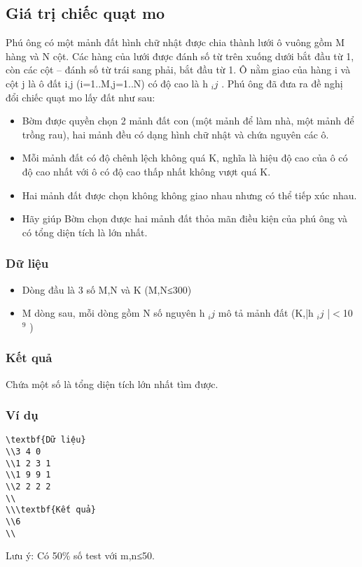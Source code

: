 







\subsection{   Giá trị chiếc quạt mo  }

   Phú ông có một mảnh đất hình chữ nhật được chia thành lưới ô vuông gồm M hàng và N cột. Các hàng của lưới được đánh số từ trên xuống dưới bắt đầu từ 1, còn các cột – đánh số từ trái sang phải, bắt đầu từ 1. Ô nằm giao của hàng i và cột j là ô đất i,j (i=1..M,j=1..N) có độ cao là h   $_    ij   $   . Phú ông đã đưa ra đề nghị đổi chiếc quạt mo lấy đất như sau:  
\begin{itemize}
	\item     Bờm được quyền chọn 2 mảnh đất con (một mảnh để làm nhà, một mảnh để trồng rau), hai mảnh đều có dạng hình chữ nhật và chứa nguyên các ô.   
	\item     Mỗi mảnh đất có độ chênh lệch không quá K, nghĩa là hiệu độ cao của ô có độ cao nhất với ô có độ cao thấp nhất không vượt quá K.   
	\item     Hai mảnh đất được chọn không không giao nhau nhưng có thể tiếp xúc nhau.   
	\item     Hãy giúp Bờm chọn được hai mảnh đất thỏa mãn điều kiện của phú ông và có tổng diện tích là lớn nhất.   
\end{itemize}

\subsubsection{   Dữ liệu  }
\begin{itemize}
	\item     Dòng đầu là 3 số M,N và  K (M,N≤300)   
	\item     M dòng sau, mỗi dòng gồm N số nguyên h    $_     ij    $    mô tả mảnh đất (K,|h    $_     ij    $    |$<$10    $^     9    $    )   
\end{itemize}

\subsubsection{   Kết quả  }

   Chứa một số là tổng diện tích lớn nhất tìm được.  

\subsubsection{   Ví dụ  }
\begin{verbatim}
\textbf{Dữ liệu}
\\3 4 0
\\1 2 3 1
\\1 9 9 1
\\2 2 2 2	
\\
\\\textbf{Kết quả}
\\6
\\\end{verbatim}

   Lưu ý: Có 50\% số test với m,n≤50.  

